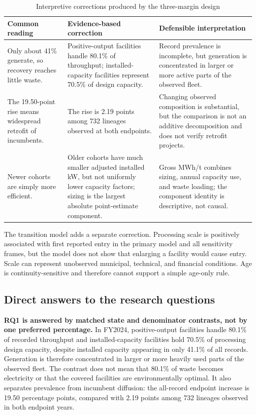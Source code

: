 \documentclass[12pt,letterpaper]{article}
\begin{document}
\begin{table}[!htbp]
\centering
\caption{Interpretive corrections produced by the three-margin design}
\label{tab:interpretive-corrections}
\scriptsize
\setlength{\tabcolsep}{3.2pt}
\renewcommand{\arraystretch}{1.14}
\begin{tabularx}{\textwidth}{L{3.6cm}YY}
\toprule
Common reading & Evidence-based correction & Defensible interpretation \\
\midrule
Only about 41\% generate, so recovery reaches little waste. &
Positive-output facilities handle 80.1\% of throughput; installed-capacity
facilities represent 70.5\% of design capacity. &
Record prevalence is incomplete, but generation is concentrated in larger or
more active parts of the observed fleet. \\
The 19.50-point rise means widespread retrofit of incumbents. &
The rise is 2.19 points among 732 lineages observed at both endpoints. &
Changing observed composition is substantial, but the comparison is not an
additive decomposition and does not verify retrofit projects. \\
Newer cohorts are simply more efficient. &
Older cohorts have much smaller adjusted installed kW, but not uniformly lower
capacity factors; sizing is the largest absolute point-estimate component. &
Gross MWh/t combines sizing, annual capacity use, and waste loading; the
component identity is descriptive, not causal. \\
\bottomrule
\end{tabularx}
\renewcommand{\arraystretch}{1}
\normalsize
\end{table}

The transition model adds a separate correction. Processing scale is positively
associated with first reported entry in the primary model and all sensitivity
frames, but the model does not show that enlarging a facility would cause entry.
Scale can represent unobserved municipal, technical, and financial conditions.
Age is continuity-sensitive and therefore cannot support a simple age-only rule.

\subsection{Direct answers to the research questions}

\textbf{RQ1 is answered by matched state and denominator contrasts, not by one
preferred percentage.} In FY2024, positive-output facilities handle 80.1\% of
recorded throughput and installed-capacity facilities hold 70.5\% of processing
design capacity, despite installed capacity appearing in only 41.1\% of all
records. Generation is therefore concentrated in larger or more heavily used
parts of the observed fleet. The contrast does not mean that 80.1\% of waste
becomes electricity or that the covered facilities are environmentally optimal.
It also separates prevalence from incumbent diffusion: the all-record endpoint
increase is 19.50 percentage points, compared with 2.19 points among 732
lineages observed in both endpoint years.
\end{document}
